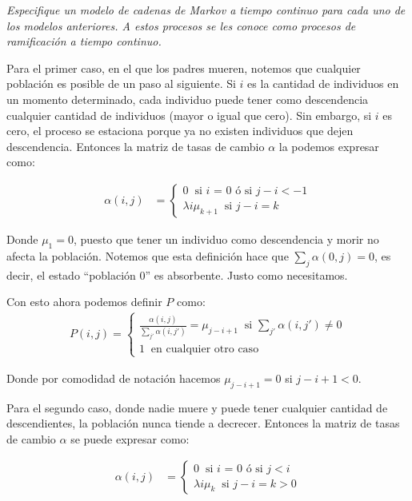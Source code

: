 \emph{
    Especifique un modelo de cadenas de Markov a tiempo continuo para cada uno de los
    modelos anteriores. A estos procesos se les conoce como procesos de ramificaci\'on
    a tiempo continuo.\pn
}
\afterstatement\pn

Para el primer caso, en el que los padres mueren, notemos que cualquier población es posible de un paso al 
siguiente. Si $i$ es la cantidad de individuos en un momento determinado, cada individuo puede tener como
descendencia cualquier cantidad de individuos (mayor o igual que cero). Sin embargo, si $i$ es cero, el proceso
se estaciona porque ya no existen individuos que dejen descendencia. Entonces la matriz de tasas de cambio $\alpha$
la podemos expresar como:

\begin{align}
        \alpha(i,j)  &=
                \begin{cases}
                    0                   \;\; \text{si $i$ = 0 ó si $j - i < -1$}          \\
                    \lambda i \mu_{k+1} \;\; \text{si $j - i = k$}
                \end{cases}
\end{align}\pn

Donde $\mu_1 = 0$, puesto que tener un individuo como descendencia y morir no afecta la población.
Notemos que esta definición hace que $\sum_j \alpha(0,j) = 0$, es decir, el estado ``población 0'' es
absorbente. Justo como necesitamos.\pn

Con esto ahora podemos definir $P$ como:
\begin{align}
        P(i,j)  = 
            \begin{cases}
                \frac{\alpha(i,j)}{\sum_{j'}\alpha(i, j')} = \mu_{j-i+1}  \;\; \text{si $\sum_{j'}\alpha(i, j') \not= 0$} \\
                1                                                         \;\; \text{en cualquier otro caso}
            \end{cases}
\end{align}

Donde por comodidad de notación hacemos $\mu_{j-i+1} = 0$ si $j - i + 1< 0$.\pn

Para el segundo caso, donde nadie muere y puede tener cualquier cantidad de descendientes, la población nunca tiende a decrecer. 
Entonces la matriz de tasas de cambio $\alpha$ se puede expresar como:

\begin{align}
        \alpha(i,j)  &=
                \begin{cases}
                    0                   \;\; \text{si $i$ = 0 ó si $j < i$}          \\
                    \lambda i \mu_{k}   \;\; \text{si $j - i = k > 0$}
                \end{cases}
\end{align}\pn


